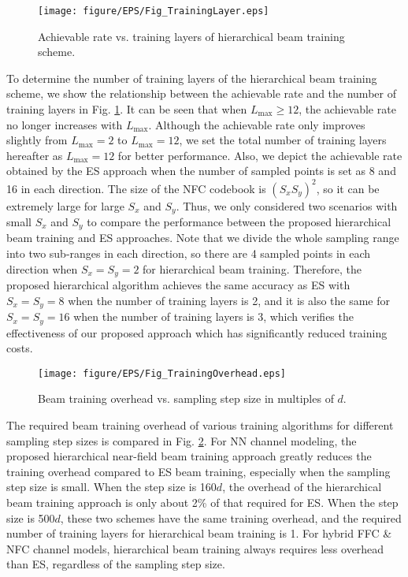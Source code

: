 \documentclass[lettersize, journal]{IEEEtran}
\begin{document}
\begin{figure}[t]
\centering
\texttt{[image: figure/EPS/Fig\_TrainingLayer.eps]}
\caption{Achievable rate vs. training layers of hierarchical beam training scheme.}
\label{Fig_TrainingLayer}
\end{figure}


To determine the number of training layers of the hierarchical beam training scheme, we show the relationship between the achievable rate and the number of training layers in Fig. {\ref{Fig_TrainingLayer}}.
It can be seen that when $L_{\max} \ge 12$, the achievable rate no longer increases with $L_{\max}$.
Although the achievable rate only improves slightly from $L_{\max} = 2$ to $L_{\max} = 12$, we set the total number of training layers hereafter as $L_{\max}=12$ for better performance.
Also, we depict the achievable rate obtained by the ES approach when the number of sampled points is set as 8 and 16 in each direction.
The size of the NFC codebook is $\left( S_x  S_y \right)^2$, so it can be extremely large for large $S_x$ and  $S_y$.
Thus, we only considered two scenarios with small $S_x$ and  $S_y$ to compare the performance between the proposed hierarchical beam training and ES approaches.
Note that we divide the whole sampling range into two sub-ranges in each direction, so there are 4 sampled points in each direction when $S_x = S_y = 2$ for hierarchical beam training.
Therefore, the proposed hierarchical algorithm achieves the same accuracy as ES with $S_x = S_y = 8$ when the number of training layers is 2, and it is also the same for $S_x = S_y = 16$ when the number of training layers is 3, which verifies the effectiveness of our proposed approach which has significantly reduced training costs.

\begin{figure}[t]
\centering
\texttt{[image: figure/EPS/Fig\_TrainingOverhead.eps]}
\caption{Beam training overhead vs. sampling step size in multiples of $d$.}
\label{Fig_TrainingOverhead}
\end{figure}


The required beam training overhead of various training algorithms for different sampling step sizes is compared in Fig. {\ref{Fig_TrainingOverhead}}.
For NN channel modeling, the proposed hierarchical near-field beam training approach greatly reduces the training overhead compared to ES beam training, especially when the sampling step size is small.
When the step size is 160$d$, the overhead of the hierarchical beam training approach is only about 2\% of that required for ES. 
When the step size is 500$d$, these two schemes have the same training overhead, and the required number of training layers for hierarchical beam training is 1.
For hybrid FFC \& NFC channel models, hierarchical beam training always requires less overhead than ES, regardless of the sampling step size.
\end{document}
